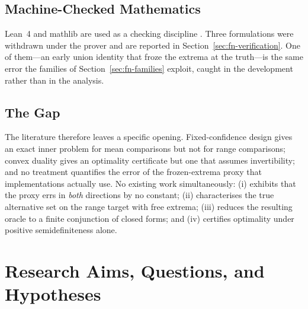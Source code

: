 \subsection{Machine-Checked Mathematics}

Lean~4 and mathlib are used as a checking discipline \cite{demoura2021,mathlib2020}. Three
formulations were withdrawn under the prover and are reported in
Section~\ref{sec:fn-verification}. One of them---an early union identity that froze the extrema
at the truth---is the same error the families of Section~\ref{sec:fn-families} exploit, caught
in the development rather than in the analysis.

\subsection{The Gap}

The literature therefore leaves a specific opening. Fixed-confidence design gives an exact
inner problem for mean comparisons but not for range comparisons; convex duality gives an
optimality certificate but one that assumes invertibility; and no treatment quantifies the
error of the frozen-extrema proxy that implementations actually use. No existing work
simultaneously: (i) exhibits that the proxy errs in \emph{both} directions by no constant;
(ii) characterises the true alternative set on the range target with free extrema;
(iii) reduces the resulting oracle to a finite conjunction of closed forms; and
(iv) certifies optimality under positive semidefiniteness alone.


\section{Research Aims, Questions, and Hypotheses}

